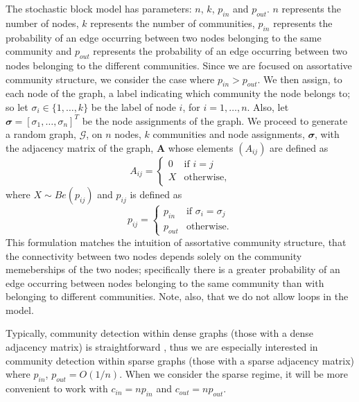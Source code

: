 \documentclass[12pt]{article}
\numberwithin{equation}{section}
\newcommand*\vecvar[1]{\mathbfit#1}
\newcommand*\matvar[1]{\mathbf#1}
\newcommand*\graphvar[1]{\mathcal#1}
\begin{document}
The stochastic block model has parameters: $n$, $k$, $p_{in}$ and $p_{out}$. $n$ represents the number of nodes, $k$ represents the number of communities, $p_{in}$ represents the probability of an edge occurring between two nodes belonging to the same community and $p_{out}$ represents the probability of an edge occurring between two nodes belonging to the different communities. Since we are focused on assortative community structure, we consider the case where $p_{in} > p_{out}$. We then assign, to each node of the graph, a label indicating which community the node belongs to; so let $\sigma_{i} \in \{1,\dots,k\}$ be the label of node $i$, for $i = 1,\dots,n$. Also, let $\vecvar{\sigma} = [\sigma_{1},\dots,\sigma_{n}]^{T}$ be the node assignments of the graph. We proceed to generate a random graph, $\graphvar{G}$, on $n$ nodes, $k$ communities and node assignments, $\vecvar{\sigma}$, with the adjacency matrix of the graph, $\matvar{A}$ whose elements $(A_{ij})$ are defined as
\begin{equation}
	A_{ij} =
	\begin{cases}
		0 & \text{if } i = j\\
		X & \text{otherwise},
	\end{cases}
\end{equation}
where $X \sim Be(p_{ij})$ and {$p_{ij}$} is defined as
\begin{equation}
	p_{ij} =
	\begin{cases}
		p_{in} & \text{if } \sigma_{i} = \sigma_{j}\\
		p_{out} & \text{otherwise}.
	\end{cases}
\end{equation}
This formulation matches the intuition of assortative community structure, that the connectivity between two nodes depends solely on the community memeberships of the two nodes; specifically there is a greater probability of an edge occurring between nodes belonging to the same community than with belonging to different communities. Note, also, that we do not allow loops in the model.

Typically, community detection within dense graphs (those with a dense adjacency matrix) is straightforward \cite{DKM+13}, thus we are especially interested in community detection within sparse graphs (those with a sparse adjacency matrix) where $p_{in}$, $p_{out} = O(1/n)$. When we consider the sparse regime, it will be more convenient to work with $c_{in} = np_{in}$ and $c_{out} = np_{out}$.
\end{document}
